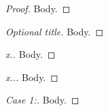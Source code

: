 \documentclass{article}
\begin{document}
\begin{proof}
Body.
\end{proof}

\begin{proof}[Optional title]
Body.
\end{proof}

\begin{proof}[x.]
Body.
\end{proof}

\begin{proof}[x..]
Body.
\end{proof}

\begin{proof}[Case 1:]
Body.
\end{proof}
\end{document}
